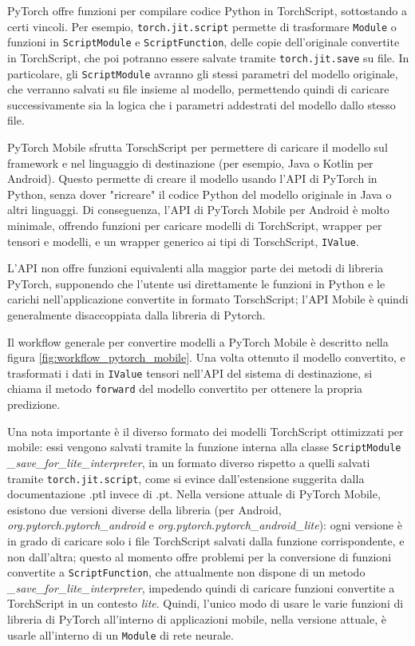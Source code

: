 PyTorch offre funzioni per compilare codice Python in TorchScript, sottostando a certi
vincoli. Per esempio, \texttt{torch.jit.script} permette di trasformare \texttt{Module}
o funzioni in \texttt{ScriptModule} e \texttt{ScriptFunction}, delle copie dell'originale
convertite in TorchScript, che poi potranno essere salvate tramite \texttt{torch.jit.save}
su file. In particolare, gli \texttt{ScriptModule} avranno gli stessi parametri del modello
originale, che verranno salvati su file insieme al modello, permettendo quindi di caricare
successivamente sia la logica che i parametri addestrati del modello dallo stesso file.

PyTorch Mobile sfrutta TorschScript per permettere di caricare il modello sul framework 
e nel linguaggio di destinazione (per esempio, Java o Kotlin per Android). Questo permette
di creare il modello usando l'API di PyTorch in Python, senza dover "ricreare" il codice
Python del modello originale in Java o altri linguaggi. Di conseguenza, l'API di PyTorch 
Mobile per Android è molto minimale, offrendo funzioni per caricare modelli di TorchScript, 
wrapper per tensori e modelli, e un wrapper generico ai tipi di TorschScript, \texttt{IValue}.

L'API non offre funzioni equivalenti alla maggior parte dei metodi di libreria PyTorch, 
supponendo che l'utente usi direttamente le funzioni in Python e le carichi nell'applicazione
convertite in formato TorschScript; l'API Mobile è quindi generalmente disaccoppiata dalla
libreria di Pytorch.

Il workflow generale per convertire modelli a PyTorch Mobile è descritto nella figura 
\ref{fig:workflow_pytorch_mobile}. Una volta ottenuto il modello convertito, e trasformati
i dati in \texttt{IValue} tensori nell'API del sistema di destinazione, si chiama il metodo
\texttt{forward} del modello convertito per ottenere la propria predizione.

Una nota importante è il diverso formato dei modelli TorchScript ottimizzati per mobile: 
essi vengono salvati tramite la funzione interna alla classe \texttt{ScriptModule}
\emph{\_save\_for\_lite\_interpreter}, in un formato diverso rispetto a quelli salvati tramite
\texttt{torch.jit.script}, come si evince dall'estensione suggerita dalla documentazione .ptl
invece di .pt. Nella versione attuale di PyTorch Mobile, esistono due versioni diverse della
libreria (per Android, \emph{org.pytorch.pytorch\_android} e 
\emph{org.pytorch.pytorch\_android\_lite}): ogni versione è in grado di caricare solo i file
TorchScript salvati dalla funzione corrispondente, e non dall'altra; questo al momento offre
problemi per la conversione di funzioni convertite a \texttt{ScriptFunction}, che attualmente
non dispone di un metodo \emph{\_save\_for\_lite\_interpreter}, impedendo quindi di caricare 
funzioni convertite a TorchScript in un contesto \emph{lite}. Quindi, l'unico modo di usare
le varie funzioni di libreria di PyTorch all'interno di applicazioni mobile, nella versione 
attuale, è usarle all'interno di un \texttt{Module} di rete neurale.

